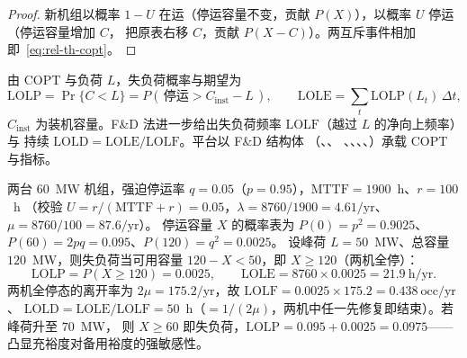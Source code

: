 \begin{proof}
新机组以概率 $1-U$ 在运（停运容量不变，贡献 $P(X)$），以概率 $U$ 停运（停运容量增加 $C$，
把原表右移 $C$，贡献 $P(X-C)$）。两互斥事件相加即~\eqref{eq:rel-th-copt}。
\end{proof}

由 COPT 与负荷 $L$，失负荷概率与期望为
\begin{equation}
 \mathrm{LOLP}=\Pr\{C<L\}=P(\,\text{停运}>C_{\mathrm{inst}}-L\,),\qquad
 \mathrm{LOLE}=\sum_{t}\mathrm{LOLP}(L_t)\,\Delta t,
 \label{eq:rel-th-lole}
\end{equation}
$C_{\mathrm{inst}}$ 为装机容量。F\&D 法进一步给出失负荷频率 $\mathrm{LOLF}$（越过 $L$ 的净向上频率）与
持续 $\mathrm{LOLD}=\mathrm{LOLE}/\mathrm{LOLF}$。平台以 F\&D 结构体
（、、
、、、、）承载 COPT 与指标。

\begin{example}\label{ex:rel-th-copt}
两台 $60$~MW 机组，强迫停运率 $q=0.05$（$p=0.95$），$\mathrm{MTTF}=1900$~h、$r=100$~h
（校验 $U=r/(\mathrm{MTTF}{+}r)=0.05$，$\lambda=8760/1900=4.61/\text{yr}$、$\mu=8760/100=87.6/\text{yr}$）。
停运容量 $X$ 的概率表为 $P(0){=}p^2{=}0.9025$、$P(60){=}2pq{=}0.095$、$P(120){=}q^2{=}0.0025$。
设峰荷 $L=50$~MW、总容量 $120$~MW，则失负荷当可用容量 $120-X<50$，即 $X\ge120$（两机全停）：
\begin{equation*}
 \mathrm{LOLP}=P(X{\ge}120)=0.0025,\qquad \mathrm{LOLE}=8760\times0.0025=21.9~\text{h/yr}.
\end{equation*}
两机全停态的离开率为 $2\mu=175.2/\text{yr}$，故 $\mathrm{LOLF}=0.0025\times175.2=0.438~\text{occ/yr}$、
$\mathrm{LOLD}=\mathrm{LOLE}/\mathrm{LOLF}=50$~h（$=1/(2\mu)$，两机中任一先修复即结束）。若峰荷升至 $70$~MW，
则 $X{\ge}60$ 即失负荷，$\mathrm{LOLP}=0.095{+}0.0025=0.0975$——凸显充裕度对备用裕度的强敏感性。
\end{example}

